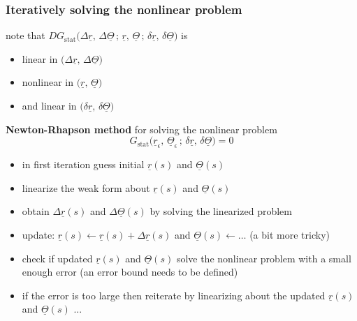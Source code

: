 \begin{frame}
  \frametitle{Iteratively solving the nonlinear problem}
  
  note that $DG_{\text{stat}} \bigl( \Delta \underline{r} , \, \Delta \underline{\Theta} \, ; \,\underline{r} , \, \underline{\Theta} \, ; \, \delta \underline{r} , \, \delta \underline{\Theta} \bigr)$ is
  \begin{itemize}
    \item linear in $\bigl( \Delta \underline{r} , \, \Delta \underline{\Theta} \bigr)$
    \item nonlinear in $\bigl( \underline{r} , \, \underline{\Theta} \bigr)$
    \item and linear in $\bigl( \delta \underline{r} , \, \delta \underline{\Theta} \bigr)$
  \end{itemize}

  \vspace{1em}
  \textbf{Newton-Rhapson method} for solving the nonlinear problem
  \begin{displaymath}
    G_{\text{stat}} \bigl( \underline{r}_{\epsilon} , \, \underline{\Theta}_{\epsilon} \, ; \, \delta \underline{r} , \, \delta \underline{\Theta} \bigr) = 0
  \end{displaymath}
  
  \begin{itemize}
    \item in first iteration guess initial $\underline{r}(s)$ and $\underline{\Theta}(s)$
    \item linearize the weak form about $\underline{r}(s)$ and $\underline{\Theta}(s)$
    \item obtain $\Delta \underline{r}(s)$ and $\Delta \underline{\Theta}(s)$ by solving the linearized problem 
    \item update: $\underline{r}(s) \leftarrow \underline{r}(s) + \Delta \underline{r}(s)$ and $\underline{\Theta}(s) \leftarrow \dots$ (a bit more tricky) %
    \item check if updated $\underline{r}(s)$ and $\underline{\Theta}(s)$ solve the nonlinear problem \newline with a small enough error \: (an error bound needs to be defined)
    \item if the error is too large then reiterate by linearizing about the updated $\underline{r}(s)$ and $\underline{\Theta}(s)$ ...
  \end{itemize}

\end{frame}


